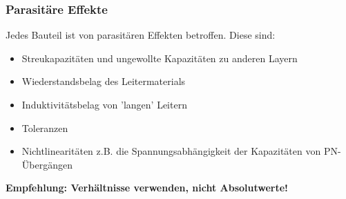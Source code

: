 \subsubsection{Parasitäre Effekte}

Jedes Bauteil ist von parasitären Effekten betroffen. 
Diese sind:
\begin{itemize}
    \item Streukapazitäten und ungewollte Kapazitäten zu anderen Layern
    \item Wiederstandsbelag des Leitermaterials
    \item Induktivitätsbelag von 'langen' Leitern
    \item Toleranzen
    \item Nichtlinearitäten z.B. die Spannungsabhängigkeit der Kapazitäten von PN-Übergängen
\end{itemize}

\smallskip

\textbf{\rightarrow Empfehlung: Verhältnisse verwenden, nicht Absolutwerte!}

